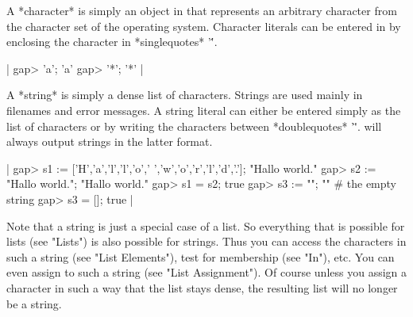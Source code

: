 %
%

A *character*  is simply an object in {\GAP} that represents an arbitrary
character from the character set  of  the  operating  system.   Character
literals  can  be  entered  in  {\GAP}  by  enclosing  the  character  in
*singlequotes* '\''.

|    gap> 'a';
    'a'
    gap> '*';
    '*' |

A *string* is simply a dense list of characters.  Strings are used mainly
in filenames and error messages.  A string literal can either be  entered
simply  as  the  list of characters or by  writing the characters between
*doublequotes* '\"'.   {\GAP}  will always output strings  in  the latter
format.

|    gap> s1 := ['H','a','l','l','o',' ','w','o','r','l','d','.'];
    "Hallo world."
    gap> s2 := "Hallo world.";
    "Hallo world."
    gap> s1 = s2;
    true
    gap> s3 := "";
    ""    # the empty string
    gap> s3 = [];
    true |

Note that a string is just a special case  of a list.  So everything that
is possible for lists (see  "Lists")  is also possible for strings.  Thus
you can  access  the characters in  such  a string (see "List Elements"),
test  for  membership (see  "In"), etc.  You can  even assign  to such  a
string (see "List Assignment").  Of course unless you  assign a character
in such a way  that the  list  stays dense,  the  resulting  list will no
longer be a string.

